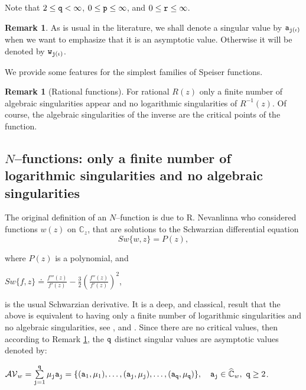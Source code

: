 \documentclass[final,3p,times]{elsarticle}
\newcommand{\CC}{\ensuremath{{\mathbb C}}}
\newcommand{\CW}{\ensuremath{{\widehat{\mathbb C}}}}
\theoremstyle{definition}
\newtheorem{remark}[theorem]{Remark}
\begin{document}
\noindent
Note that $2\leq {\tt q} <\infty$, 
$0\leq{\tt p}\leq \infty$, 
and $0\leq {\tt r} \leq \infty$.

\begin{remark}
\label{rem:val-asint-con-as}
As is usual in the literature,
we shall denote a singular value by ${\tt a}_{{\tt j}(\iota)}$ when we want to 
emphasize that it is an asymptotic value. 
Otherwise it will be denoted by ${\tt w}_{{\tt j}(\iota)}$.
\end{remark}


We provide some features for the simplest 
families of Speiser functions.


\begin{remark}[Rational functions]
For rational $R(z)$ only a finite number of algebraic singularities appear and no logarithmic singularities of $R^{-1}(z)$.
Of course, the algebraic singularities of the inverse are the critical points of the function.
\end{remark}


\subsection{$N$--functions: only a finite number of logarithmic singularities and no algebraic singularities}
\label{sec:N-functions}
The original definition of an $N$--function is due to R. Nevanlinna who considered functions $w(z)$ 
on $\CC_z$, that are solutions
to the Schwarzian differential equation 
\begin{equation}
\label{eq:Schwarzian-diff-eqn}
Sw\{ w, z \} = P(z),
\end{equation}

\noindent
 where $P(z)$ is a polynomial, and 

\centerline{
$Sw\{ f, z \} \doteq 
\frac{f'''(z)}{f'(z)} - 
\frac{3}{2} \left(\frac{f''(z)}{f'(z)} \right)^2$,
}

\noindent 
is the usual Schwarzian derivative.
It is a deep, and classical, result that the above is equivalent to having only a finite number of logarithmic singularities and no algebraic singularities, see 
\cite{Nevanlinna1}, \cite{Nevanlinna2} and
\cite{EremenkoMerenkov2}.
Since there are no critical values, then according to Remark \ref{rem:val-asint-con-as},
the $\tt q$ distinct singular values are 
asymptotic values denoted by:

\centerline{
$
\mathcal{AV}_w =
\sum\limits_{{\tt j} =1}^{\tt q} \mu_{\tt j}  {\tt a}_{\tt j}=
\{({\tt a}_1, \mu_1 ), \ldots , 
({\tt a}_{\tt j} ,\mu_{\tt j} ), \ldots, 
({\tt a}_{\tt q}, \mu_{\tt q}  ) \},
\ \ \
{\tt a}_{\tt j} \in \CW_w, \
{\tt q} \geq 2
$.
}
\end{document}
